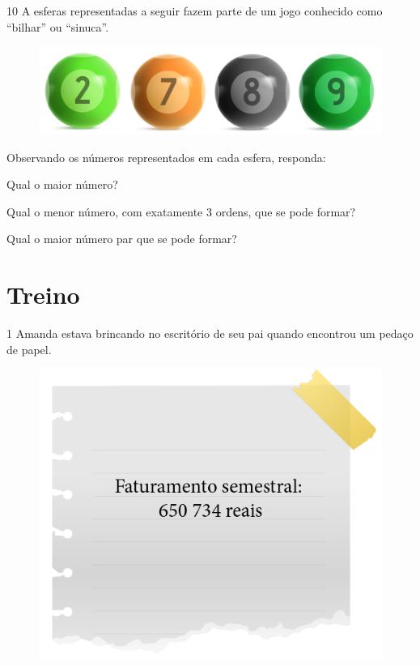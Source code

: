 
\pagebreak
\num{10} A esferas representadas a seguir fazem parte de um jogo conhecido como
“bilhar” ou “sinuca”.

\begin{figure}[htpb!]
\includegraphics[width=\textwidth]{../ilustracoes/MAT5/SAEB_5ANO_MAT_figura11.png}
\end{figure}

Observando os números representados em cada esfera, responda:

\begin{escolha}
\item  Qual o maior número?
\item{}

\item  Qual o menor número, com exatamente 3 ordens, que se pode formar?
\item{}

\item  Qual o maior número par que se pode formar?
\item{}

\end{escolha}


\pagebreak
\section{Treino}


\num{1} Amanda estava brincando no escritório de seu pai quando encontrou um pedaço de papel.

\begin{figure}[htpb!]
\centering
\includegraphics[width=.4\textwidth]{../ilustracoes/MAT5/SAEB_5ANO_MAT_figura12.png}
\end{figure}

